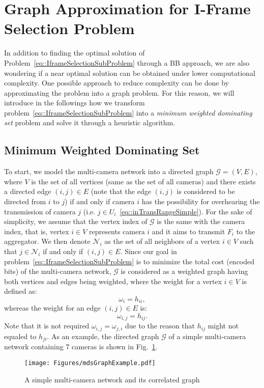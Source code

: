 \section{Graph Approximation for I-Frame Selection Problem}
\label{sec::graphApprox}
In addition to finding the optimal solution of Problem~\eqref{eq::IframeSelectionSubProblem} through a BB approach, we are also wondering if a near optimal solution can be obtained under lower computational complexity.
One possible approach to reduce complexity can be done by approximating the problem into a graph problem.
For this reason, we will introduce in the followings how we transform problem~\eqref{eq::IframeSelectionSubProblem} into a \emph{minimum weighted dominating set} problem and solve it through a heuristic algorithm.
%
\subsection{Minimum Weighted Dominating Set}
To start, we model the multi-camera network into a directed graph $\mathcal{G}=(V,E)$, where $V$ is the set of all vertices (same as the set of all cameras) and there exists a directed edge $(i,j) \in E$ (note that the edge $(i,j)$ is considered to be directed from $i$ to $j$) if and only if camera $i$ has the possibility for overhearing the transmission of camera $j$ (i.e. $j \in U_i$~\eqref{eq::inTransRangeSimple}).
For the sake of simplicity, we assume that the vertex index of $\mathcal{G}$ is the same with the camera index, that is, vertex $i \in V$ represents camera $i$ and it aims to transmit $F_i$ to the aggregator.
We then denote $\mathcal{N}_i$ as the set of all neighbors of a vertex $i \in V$ such that $j \in \mathcal{N}_i$ if and only if $(i,j) \in E$.
Since our goal in problem~\eqref{eq::IframeSelectionSubProblem} is to minimize the total cost (encoded bits) of the multi-camera network, $\mathcal{G}$ is considered as a weighted graph having both vertices and edges being weighted, where the weight for a vertex $i \in V$ is defined as:
\begin{equation}
\omega_i = h_{ii},
\end{equation}
whereas the weight for an edge $(i,j) \in E$ is:
\begin{equation}
\omega_{i,j} = h_{ij}.
\end{equation}
Note that it is not required $\omega_{i,j} = \omega_{j,i}$ due to the reason that $h_{ij}$ might not equaled to $h_{ji}$.
As an example, the directed graph $\mathcal{G}$ of a simple multi-camera network containing $7$ cameras is shown in Fig.~\ref{fig::mdsGraphExample}.
%
\begin{figure}
\begin{center}
\texttt{[image: Figures/mdsGraphExample.pdf]}
\caption{\label{fig::mdsGraphExample}A simple multi-camera network and its correlated graph}
\end{center}
\end{figure}
%


